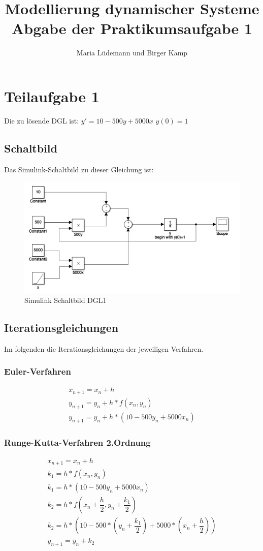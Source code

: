 \documentclass[]{scrartcl}
\title{Modellierung dynamischer Systeme  \\ Abgabe der Praktikumsaufgabe 1}
\author{Maria Lüdemann und Birger Kamp}
\begin{document}
\maketitle

\begin{abstract}

\end{abstract}

\section*{Teilaufgabe 1}
Die zu lösende DGL ist:
$ y' = 10 - 500y + 5000x $
$ y(0) = 1 $

\subsection*{Schaltbild}
Das Simulink-Schaltbild zu dieser Gleichung ist:

\begin{figure}[htbp]
\centering
\includegraphics[width=0.7\linewidth]{A1_1_Schaltbild}
\caption{Simulink Schaltbild DGL1}
\label{fig:A1_1_Schaltbild}
\end{figure}

\subsection*{Iterationsgleichungen}
Im folgenden die Iterationsgleichungen der jeweiligen Verfahren.

\subsubsection*{Euler-Verfahren}
\begin{align}
x_{n+1} = x_{n}+h \\
y_{n+1} = y_{n}+h*f(x_{n},y_{n}) \\
y_{n+1} = y_{n}+h*(10-500y_{n}+5000x_{n})
\end{align}

\subsubsection*{Runge-Kutta-Verfahren 2.Ordnung}
\begin{align}
x_{n+1} = x_{n}+h \\
k_{1} = h*f(x_{n},y_{n}) \\
k_{1} = h*(10-500y_{n}+5000x_{n}) \\
k_{2} = h*f(x_{n} + \dfrac{h}{2},y_{n} + \dfrac{k_{1}}{2}) \\
k_{2} = h*(10-500*(y_{n} + \dfrac{k_{1}}{2})+5000*(x_{n} + \dfrac{h}{2})) \\
y_{n+1} = y_{n}+k_{2}
\end{align}
\end{document}
